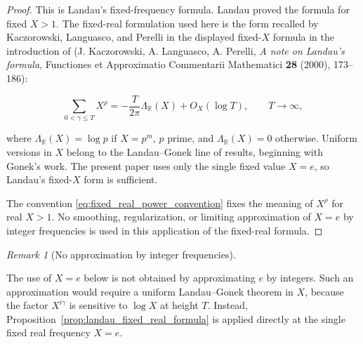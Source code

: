 \documentclass[11pt]{amsart}
\numberwithin{equation}{section}
\theoremstyle{plain}
\theoremstyle{definition}
\theoremstyle{remark}
\newtheorem{remark}[theorem]{Remark}
\begin{document}
\begin{proof}
This is Landau's fixed-frequency formula. Landau proved the formula for
fixed \(X>1\). The fixed-real formulation used here is the form recalled
by Kaczorowski, Languasco, and Perelli in the displayed fixed-\(X\)
formula in the introduction of
\cite{KaczorowskiLanguascoPerelli2000}
(J. Kaczorowski, A. Languasco, A. Perelli,
\emph{A note on Landau's formula}, Functiones et Approximatio
Commentarii Mathematici \textbf{28} (2000), 173--186):

\begin{equation}
\sum_{0<\gamma\le T}X^\rho
=
-
\frac{T}{2\pi}
\Lambda_{\mathbb R}(X)
+
O_X(\log T),
\qquad T\to\infty,
\end{equation}

where \(\Lambda_{\mathbb R}(X)=\log p\) if \(X=p^m\), \(p\) prime, and
\(\Lambda_{\mathbb R}(X)=0\) otherwise. Uniform versions in \(X\) belong
to the Landau--Gonek line of results, beginning with Gonek's work. The
present paper uses only the single fixed value \(X=e\), so Landau's
fixed-\(X\) form is sufficient.

The convention \eqref{eq:fixed_real_power_convention} fixes the meaning
of \(X^\rho\) for real \(X>1\). No smoothing, regularization, or
limiting approximation of \(X=e\) by integer frequencies is used in this
application of the fixed-real formula.
\end{proof}

\begin{remark}[No approximation by integer frequencies]
\label{rem:no_integer_approximation_for_e}

The use of \(X=e\) below is not obtained by approximating \(e\) by
integers. Such an approximation would require a uniform Landau--Gonek
theorem in \(X\), because the factor \(X^{i\gamma}\) is sensitive to
\(\log X\) at height \(T\). Instead,
Proposition~\ref{prop:landau_fixed_real_formula} is applied directly at
the single fixed real frequency \(X=e\).

\end{remark}
\end{document}
